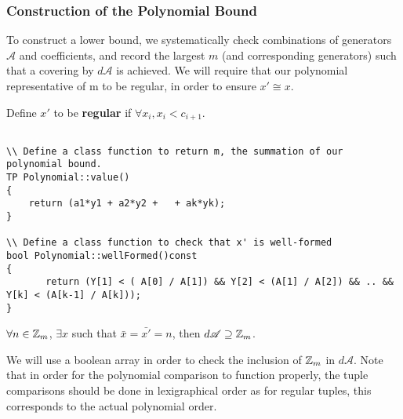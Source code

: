 \subsubsection{Construction of the Polynomial Bound}

To construct a lower bound, we systematically check combinations of generators $\mathscr{A}$ and coefficients, and record the largest $m$ (and corresponding generators) such that a covering by $d \mathscr{A}$ is achieved.\n
We will require that our polynomial representative of m to be regular, in order to ensure $x' \cong x$.

\begin{proposition}
Define $x'$ to be \textbf{regular} if $\forall x_i, x_i < c_{i+1}$.  
\end{proposition}

\begin{lstlisting}

\\ Define a class function to return m, the summation of our polynomial bound.
TP Polynomial::value()
{
    return (a1*y1 + a2*y2 +   + ak*yk);
}

\\ Define a class function to check that x' is well-formed
bool Polynomial::wellFormed()const
{
       return (Y[1] < ( A[0] / A[1]) && Y[2] < (A[1] / A[2]) && .. && Y[k] < (A[k-1] / A[k]));
}

\end{lstlisting}

\begin{proposition}
$\forall n \in \mbox{$\mathbb Z$}_m$, $\exists  x$ such that $\bar{x} = \bar{x'}= n$, then $d \mathscr{A} \supseteq \mbox{$\mathbb Z$}_m$.\n
\end{proposition}

\noindent
We will use a boolean array in order to check the inclusion of $\mbox{$\mathbb Z$}_m$ in $d \mathscr{A}$. Note that in order for the polynomial comparison to function properly, the tuple comparisons should be done in lexigraphical order as for regular tuples, this corresponds to the actual polynomial order.

